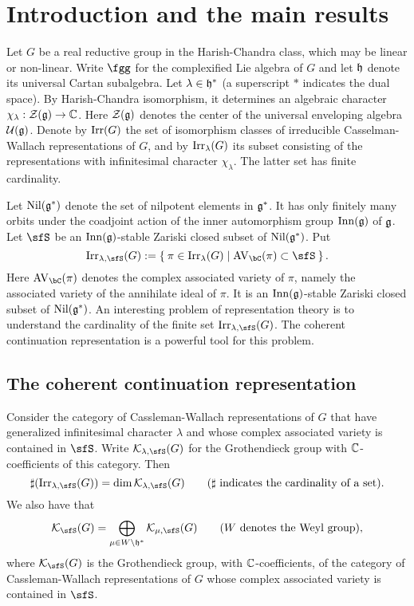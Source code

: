 \documentclass[counting_main.tex]{subfiles}
\begin{document}
\section{Introduction and the main results}

Let $G$ be a real reductive group in the Harish-Chandra class, which may be linear or non-linear. Write $\fgg$ for the complexified Lie algebra of $G$ and let $\mathfrak h$ denote its universal Cartan subalgebra. Let $\lambda \in \mathfrak h^*$ (a superscript $*$ indicates the dual space). By Harish-Chandra isomorphism, it determines  an algebraic character $\chi_\lambda: {\mathcal {Z}}(\mathfrak g)\rightarrow \mathbb{C}$. Here ${\mathcal {Z}}(\mathfrak g)$ denotes the center of the universal enveloping algebra $\mathcal U(\mathfrak g)$. Denote by $\mathrm{Irr}(G)$ the set of isomorphism classes of irreducible Casselman-Wallach representations of $G$, and by $\mathrm{Irr}_\lambda(G)$ its subset consisting of the representations with infinitesimal character $\chi_\lambda$. The latter set has finite cardinality.


Let $\mathrm{Nil}(\mathfrak g^*)$ denote the set of nilpotent elements in $\mathfrak g^*$. It has only finitely many orbits under the coadjoint action of the inner automorphism group $\mathrm{Inn}(\mathfrak g)$ of $\mathfrak g$. Let $\sfS$ be an  $\mathrm{Inn}(\mathfrak g)$-stable Zariski closed subset of $\mathrm{Nil}(\mathfrak g^*)$. Put
\[
  \Irr_{\lambda,\sfS}(G):=\Set{\pi \in \Irr_{\lambda}(G)| \text{$\AVC(\pi)\subset \sfS$} }.
\]
Here $\AVC(\pi)$ denotes the complex associated variety of $\pi$, namely the associated variety of the annihilate ideal of $\pi$. It is an  $\mathrm{Inn}(\mathfrak g)$-stable Zariski closed subset of $\mathrm{Nil}(\mathfrak g^*)$.
An interesting  problem of representation theory is to understand the cardinality of the finite set $\Irr_{\lambda,\sfS}(G)$.
The coherent continuation representation is a powerful tool for this problem.

\subsection{The coherent continuation representation}


Consider the category of Cassleman-Wallach representations of $G$ that have generalized infinitesimal character $\lambda$ and whose complex associated variety is contained in $\sfS$.
Write  $\CK_{\lambda,\sfS}(G)$ for the  Grothendieck group with $\mathbb{C}$-coefficients  of this category. Then
\[
  \sharp (\Irr_{\lambda,\sfS}(G))=\dim \CK_{\lambda,\sfS}(G)\qquad(\sharp\textrm{ indicates the cardinality of a set}).
\]
We also have that
\[
  \CK_\sfS(G)=\bigoplus_{\mu\in W\backslash  \h^*} \CK_{\mu,\sfS}(G)\qquad (W\textrm{ denotes the Weyl group}),
\]
where $\CK_{\sfS}(G)$ is  the Grothendieck group, with $\mathbb{C}$-coefficients,  of the category of Cassleman-Wallach representations of $G$ whose complex associated variety is contained in $\sfS$.
\end{document}
